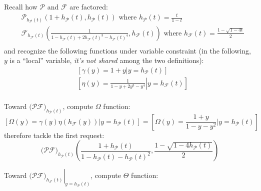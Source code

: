 \documentclass[11pt,a4paper]{article} %
\begin{document}
    Recall how $\mathcal{P}$ and $\mathcal{F}$ are factored:
    \begin{displaymath}
        \begin{split}
            &\mathcal{P}_{h_{\mathcal{P}}(t)}\left( 1+h_{\mathcal{P}}(t), h_{\mathcal{P}}(t) \right)
                \text{ where } h_{\mathcal{P}}(t) = \frac{t}{1-t}\\
            &\mathcal{F}_{h_{\mathcal{F}}(t)}\left( \frac{1}{1-h_{\mathcal{F}}(t)+
                2h_{\mathcal{F}}(t)^3-h_{\mathcal{F}}(t)^4}, h_{\mathcal{F}}(t) \right)
                    \text{ where } h_{\mathcal{F}}(t) = \frac{1-\sqrt{1-4t}}{2}\\
        \end{split}
    \end{displaymath}
    and recognize the following functions under variable constraint (in the following, $y$
    is a ``local'' variable, \emph{it's not shared} among the two definitions):
    \begin{displaymath}
        \begin{split}
            &\left[\left.\gamma(y) = 1+y \right| y=h_{\mathcal{P}}(t) \right]\\
            &\left[\left.\eta(y) = \frac{1}{1-y+2y^3-y^4} \right| y=h_{\mathcal{F}}(t) \right]\\
        \end{split}
    \end{displaymath}

    Toward $\big(\mathcal{P}\mathcal{F}\big)_{h_{\mathcal{P}}(t)}$, compute $\Omega$ function:
    \begin{displaymath}
        \left[\Omega(y)= \gamma(y)\eta(h_{\mathcal{F}}(y))| y=h_{\mathcal{P}}(t) \right]
            = \left[\Omega(y)= \frac{1+y}{1-y-y^2}| y=h_{\mathcal{P}}(t) \right]
    \end{displaymath}
    therefore tackle the first request:
    \begin{displaymath}
        \big(\mathcal{P}\mathcal{F}\big)_{h_{\mathcal{P}}(t)} \left(\frac{1+
            h_{\mathcal{P}}(t)}{1-h_{\mathcal{P}}(t)-h_{\mathcal{P}}(t)^2}, \frac{1-\sqrt{1-4h_{\mathcal{P}}(t)}}{2} \right)
    \end{displaymath}

    Toward $\left.\big(\mathcal{P}\mathcal{F}\big)_{h_{\mathcal{F}}(t)}\right|_{y=h_{\mathcal{P}}(t)}$, compute $\Theta$ function:
\end{document}
